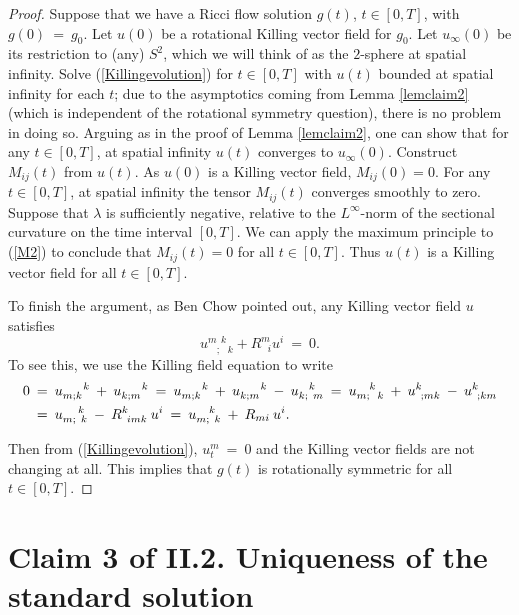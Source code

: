 \documentclass[12pt]{amsart}
\numberwithin{equation}{section}
\theoremstyle{plain}
\theoremstyle{definition}
\theoremstyle{remark}
\begin{document}
\begin{proof}
Suppose that we have a Ricci flow solution $g(t)$, $t \in [0, T]$,
with $g(0) \: = \: g_0$. Let $u(0)$ be a rotational Killing vector field
for $g_0$. Let $u_\infty(0)$ be its restriction to (any) $S^2$, which we will
think of as the $2$-sphere at spatial infinity.
Solve (\ref{Killingevolution}) for $t \in [0, T]$ with $u(t)$ bounded at
spatial infinity for each $t$;
due to the asymptotics coming from Lemma \ref{lemclaim2}
(which is independent of the
rotational symmetry question), there is no problem
in doing so. Arguing as in the proof of Lemma \ref{lemclaim2}, 
one can show that
for any $t \in [0, T]$, at spatial infinity $u(t)$ converges to
$u_\infty(0)$.
Construct $M_{ij}(t)$ from $u(t)$. As $u(0)$ is a Killing vector field,
$M_{ij}(0) = 0$. For any $t \in [0, T]$,
at spatial infinity the tensor
$M_{ij}(t)$ converges smoothly to zero.
Suppose that $\lambda$ is sufficiently negative,
relative to the $L^\infty$-norm of the sectional curvature on the 
time interval $[0, T]$. 
We can apply the maximum principle to (\ref{M2}) to conclude that
$M_{ij}(t) = 0$ for all $t \in [0, T]$. Thus $u(t)$ is a Killing
vector field for all $t \in [0, T]$.

To finish the argument,
as Ben Chow pointed out, any Killing vector field $u$
satisfies 
\begin{equation}
u^{m \: \: k}_{\: \: \: \: ;\: \: \:  k} + R^m_{\: \: \: i} u^i
\: = \: 0.
\end{equation}
To see this, we use the Killing field equation to write
\begin{align}
0 \: & = \: u_{m;k}^{\: \: \: \: \: \: \: \: k} \: + \:
u_{k;m}^{\: \: \: \: \: \: \: \: k} \: = \:
u_{m;k}^{\: \: \: \: \: \: \: \: k} \: + \:
u_{k;m}^{\: \: \: \: \: \: \: \: k} \: - \: u_{k; \: \: m}^{\: \: \: \: k}
\: = \:  u_{m; \: \: \: k}^{\: \: \: \: \: k} \: + \:
u_{\: \: ;mk}^{k} \: - \: u_{\: \: ;km}^{k} \\
& = \:
u_{m; \: \: k}^{\: \: \: \: \: \: k} \: - \: R^k_{\: \: imk} \: u^i \: = \:
u_{m; \: \: k}^{\: \: \: \: \: k} \: + \: R_{mi} \: u^i. \notag
\end{align}

Then from (\ref{Killingevolution}), $u_t^m \: = \: 0$ and the Killing vector
fields are not
changing at all.  This implies that $g(t)$ is rotationally
symmetric for all $t \in [0,T]$.
\end{proof}

\section{Claim 3 of II.2. Uniqueness of the standard solution} \label{claim3}
\end{document}
